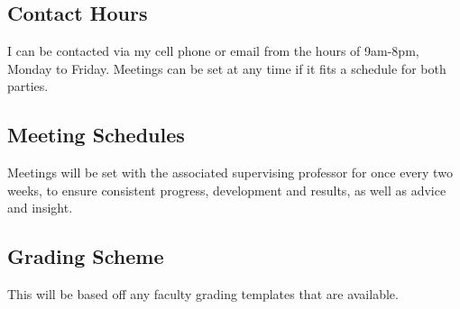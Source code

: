 \documentclass[12pt]{article}
\begin{document}
\subsection{Contact Hours}
I can be contacted via my cell phone or email from the hours of 9am-8pm, Monday to Friday. Meetings can be set at any time if it fits a schedule for both parties.
\subsection{Meeting Schedules}
Meetings will be set with the associated supervising professor for once every two weeks, to ensure consistent progress, development and results, as well as advice and insight.
\subsection{Grading Scheme}
This will be based off any faculty grading templates that are available.


\nocite{*}


\end{document}
